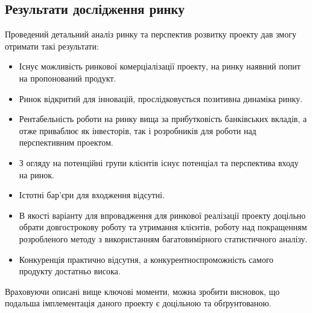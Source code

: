 \subsection{Результати дослідження ринку}
Проведений детальний аналіз ринку та перспектив розвитку проекту дав змогу отримати такі результати:
\begin{itemize}  
	\item Існує можливість ринкової комерціалізації проекту, на ринку наявний попит на пропонований продукт.
	\item Ринок відкритий для інновацій, прослідковується позитивна динаміка ринку. 
	\item Рентабельність роботи на ринку вища за прибутковість банківських вкладів, а отже приваблює як інвесторів, так і розробників для роботи над перспективним проектом. 
	\item З огляду на потенційні групи клієнтів існує потенціал та перспектива входу на ринок. 
	\item Істотні бар'єри для входження відсутні.
	\item В якості варіанту для впровадження для ринкової реалізації проекту доцільно обрати довгострокову роботу та утримання клієнтів, роботу над покращенням розробленого методу з використанням багатовимірного статистичного аналізу.
	\item Конкуренція практично відсутня, а конкурентноспроможність самого продукту достатньо висока.
\end{itemize}
Враховуючи описані вище ключові моменти, можна зробити висновок, що подальша імплементація даного проекту є доцільною та обґрунтованою.
